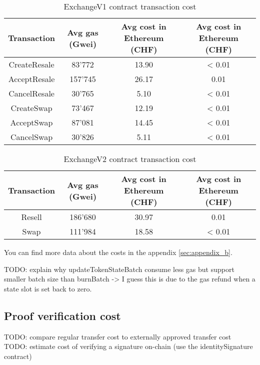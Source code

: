 \documentclass[a4paper,11pt,oneside]{report}
\begin{document}
\begin{table}[h!]
\begin{center}
\begin{NiceTabular}{ |c||c|c|c| }
 \hline
 Transaction & Avg gas (Gwei) & Avg cost in Ethereum (CHF) & Avg cost in Ethereum (CHF) \\
 \hline \hline
 CreateResale & 83'772 & 13.90 & < 0.01 \\
 AcceptResale & 157'745 & 26.17 & 0.01 \\
 CancelResale & 30'765 & 5.10 & < 0.01 \\
 CreateSwap & 73'467 & 12.19 & < 0.01 \\
 AcceptSwap & 87'081 & 14.45 & < 0.01 \\
 CancelSwap & 30'826 & 5.11 & < 0.01 \\
 \hline
\end{NiceTabular}
\caption{ExchangeV1 contract transaction cost}
\label{table:exchangeV1_contract_transaction_cost}
\end{center}
\end{table}

\begin{table}[h!]
\begin{center}
\begin{NiceTabular}{ |c||c|c|c| }
 \hline
 Transaction & Avg gas (Gwei) & Avg cost in Ethereum (CHF) & Avg cost in Ethereum (CHF) \\
 \hline \hline
 Resell & 186'680 & 30.97 & 0.01 \\
 Swap & 111'984 & 18.58 & < 0.01 \\
 \hline
\end{NiceTabular}
\caption{ExchangeV2 contract transaction cost}
\label{table:exchangeV2_contract_transaction_cost}
\end{center}
\end{table}

You can find more data about the costs in the appendix \ref{sec:appendix_b}.

TODO: explain why updateTokenStateBatch consume less gas but support smaller batch size than burnBatch -> I guess this is due to the gas refund when a state slot is set back to zero. 

\subsection{Proof verification cost}
TODO: compare regular transfer cost to externally approved transfer cost
TODO: estimate cost of verifying a signature on-chain (use the identitySignature contract)
\end{document}
